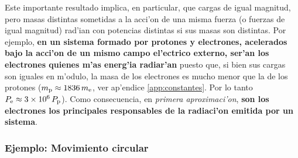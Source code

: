 Este importante resultado implica, en particular, que cargas de igual magnitud, pero masas distintas sometidas a la acci'on de una misma fuerza (o fuerzas de igual magnitud) rad'ian con potencias distintas si sus masas son distintas. Por ejemplo, \textbf{en un sistema formado por protones y electrones, acelerados bajo la acci'on de un mismo campo el'ectrico externo, ser'an los electrones quienes m'as energ'ia radiar'an} puesto que, si bien sus cargas son iguales en m'odulo, la masa de los electrones es mucho menor que la de los protones ($m_{\rm p}\approx 1836\,m_{\rm e}$, ver ap'endice \ref{app:constantes}. Por lo tanto $P_{\rm e}\approx 3\times 10^6\, P_{\rm p}$). Como consecuencia, en \textit{primera aproximaci'on}, \textbf{son los electrones los principales responsables de la radiaci'on emitida por un sistema}.

\subsubsection{Ejemplo: Movimiento circular}


